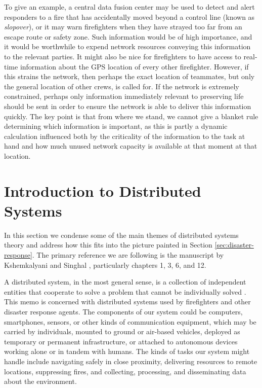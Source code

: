 \documentclass[]             %
{NASA}                       %
\theoremstyle{definition}
\begin{document}
To give an example, a central data fusion center may be used to detect
and alert responders to a fire that has accidentally moved beyond a
control line (known as \emph{slopover}), or it may warn firefighters
when they have strayed too far from an escape route or safety
zone. Such information would be of high importance, and it would be
worthwhile to expend network resources conveying this information to
the relevant parties. It might also be nice for firefighters to have
access to real-time information about the GPS location of every other
firefighter. However, if this strains the network, then perhaps the
exact location of teammates, but only the general location of other
crews, is called for. If the network is extremely constrained, perhaps
only information immediately relevant to preserving life should be
sent in order to ensure the network is able to deliver this
information quickly. The key point is that from where we stand, we
cannot give a blanket rule determining which information is important,
as this is partly a dynamic calculation influenced both by the
criticality of the information to the task at hand and how much unused
network capacity is available at that moment at that location.


\section{Introduction to Distributed Systems}
\label{sec:background}
In this section we condense some of the main themes of distributed
systems theory and address how this fits into the picture painted in
Section \ref{sec:disaster-response}. The primary reference we are
following is the manuscript by Kshemkalyani and Singhal
\cite{kshemkalyani_singhal_2008}, particularly chapters 1, 3, 6, and
12.

A distributed system, in the most general sense, is a collection of
independent entities that cooperate to solve a problem that cannot be
individually solved \cite{kshemkalyani_singhal_2008}. This memo is
concerned with distributed systems used by firefighters and other
disaster response agents. The components of our system could be
computers, smartphones, sensors, or other kinds of communication
equipment, which may be carried by individuals, mounted to ground or
air-based vehicles, deployed as temporary or permanent infrastructure,
or attached to autonomous devices working alone or in tandem with
humans. The kinds of tasks our system might handle include navigating
safely in close proximity, delivering resources to remote locations,
suppressing fires, and collecting, processing, and disseminating data
about the environment.
\end{document}

